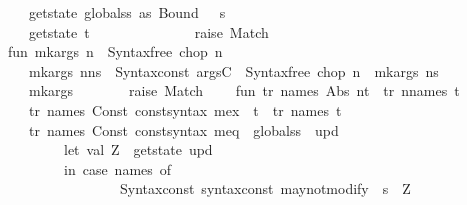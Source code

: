 \begin{isabellebody}
\ \ \ \ \ \ {\isacharbar}\ get{\isacharunderscore}state\ {\isacharparenleft}globals{\isachardollar}{\isacharparenleft}s\ as\ Bound\ {\isacharunderscore}{\isacharparenright}{\isacharparenright}\ {\isacharequal}\ s\isanewline
\ \ \ \ \ \ {\isacharbar}\ get{\isacharunderscore}state\ t\ \ \ \ \ \ \ \ \ \ \ \ \ \ {\isacharequal}\ raise\ Match{\isacharsemicolon}\isanewline
\isanewline
\ \ \ \ fun\ mk{\isacharunderscore}args\ {\isacharbrackleft}n{\isacharbrackright}\ {\isacharequal}\ Syntax{\isachardot}free\ {\isacharparenleft}chop\ n{\isacharparenright}\isanewline
\ \ \ \ \ \ {\isacharbar}\ mk{\isacharunderscore}args\ {\isacharparenleft}n{\isacharcolon}{\isacharcolon}ns{\isacharparenright}\ {\isacharequal}\ Syntax{\isachardot}const\ argsC\ {\isachardollar}\ Syntax{\isachardot}free\ {\isacharparenleft}chop\ n{\isacharparenright}\ {\isachardollar}\ mk{\isacharunderscore}args\ ns\isanewline
\ \ \ \ \ \ {\isacharbar}\ mk{\isacharunderscore}args\ {\isacharunderscore}\ \ \ \ \ \ {\isacharequal}\ raise\ Match{\isacharsemicolon}\isanewline
\isanewline
\ \ \ \ fun\ tr{\isacharprime}\ names\ {\isacharparenleft}Abs\ {\isacharparenleft}n{\isacharcomma}{\isacharunderscore}{\isacharcomma}t{\isacharparenright}{\isacharparenright}\ {\isacharequal}\ tr{\isacharprime}\ {\isacharparenleft}n{\isacharcolon}{\isacharcolon}names{\isacharparenright}\ t\isanewline
\ \ \ \ \ \ {\isacharbar}\ tr{\isacharprime}\ names\ {\isacharparenleft}Const\ {\isacharparenleft}{\isacharat}{\isacharbraceleft}const{\isacharunderscore}syntax\ mex{\isacharbraceright}{\isacharcomma}{\isacharunderscore}{\isacharparenright}\ {\isachardollar}\ t{\isacharparenright}\ {\isacharequal}\ tr{\isacharprime}\ names\ t\ \ \isanewline
\ \ \ \ \ \ {\isacharbar}\ tr{\isacharprime}\ names\ {\isacharparenleft}Const\ {\isacharparenleft}{\isacharat}{\isacharbraceleft}const{\isacharunderscore}syntax\ meq{\isacharbraceright}{\isacharcomma}{\isacharunderscore}{\isacharparenright}\ {\isachardollar}\ {\isacharparenleft}globals{\isachardollar}s{\isacharparenright}\ {\isachardollar}\ upd{\isacharparenright}\ {\isacharequal}\isanewline
\ \ \ \ \ \ \ \ \ \ \ \ let\ val\ Z\ {\isacharequal}\ get{\isacharunderscore}state\ upd{\isacharsemicolon}\isanewline
\ \ \ \ \ \ \ \ \ \ \ \ \ \ \ \ \ \ \isanewline
\ \ \ \ \ \ \ \ \ \ \ \ in\ {\isacharparenleft}case\ names\ of\ \isanewline
\ \ \ \ \ \ \ \ \ \ \ \ \ \ \ \ \ \ {\isacharbrackleft}{\isacharbrackright}\ {\isacharequal}{\isachargreater}\ Syntax{\isachardot}const\ {\isacharat}{\isacharbraceleft}syntax{\isacharunderscore}const\ {\isachardoublequote}{\isacharunderscore}may{\isacharunderscore}not{\isacharunderscore}modify{\isachardoublequote}{\isacharbraceright}\ {\isachardollar}\ s\ {\isachardollar}\ Z\isanewline

\end{isabellebody}
